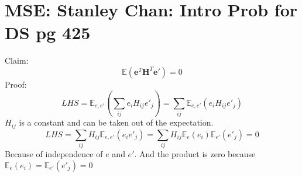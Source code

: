 \documentclass{article}
\newcommand{\beq}{\begin{equation}}
\newcommand{\eeq}{\end{equation}}
\begin{document}
\section{MSE: Stanley Chan: Intro Prob for DS pg 425}
Claim:
\beq
\mathbb{E}(\pmb{e}^T\pmb{H}^T\pmb{e}') = 0
\eeq
Proof:
\beq
LHS=\mathbb{E}_{e,e'}(\sum_{ij}e_iH_{ij}{e'}_{j}) = \sum_{ij}\mathbb{E}_{e,e'}(e_iH_{ij}{e'}_{j})
\eeq
$H_{ij}$ is a constant and can be taken out of the expectation.
\beq
LHS = \sum_{ij}H_{ij}\mathbb{E}_{e,e'}(e_i{e'}_{j}) = \sum_{ij}H_{ij}\mathbb{E}_{e}(e_i)\mathbb{E}_{e'}({e'}_j) = 0
\eeq
Because of independence of $e$ and $e'$. And the product is zero because $\mathbb{E}_{e}(e_i)=\mathbb{E}_{e'}({e'}_j)=0$
%
%
%
\end{document}
